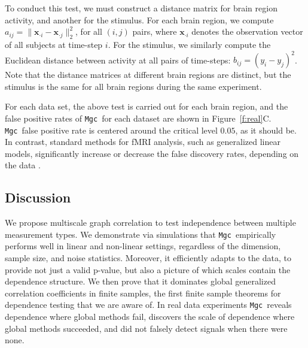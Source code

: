 \documentclass[11pt]{article}
\newcommand{\note}[2][]{\added[#1,remark={#2}]{}}
\providecommand{\sct}[1]{{\sc \texttt{#1}}}
\providecommand{\mb}[1]{\boldsymbol{#1}}
\newcommand{\Mgc}{\sct{Mgc}}
\newcommand{\cs}[1]{{\note{cs: #1}}}
\newcommand{\mbx}{\ensuremath{\mb{x}}}
\begin{document}
To conduct this test, we must construct a distance matrix for brain region activity, and another for the stimulus. For each brain region, we compute $a_{ij}=\|\mbx_{\cdot i}-\mbx_{\cdot j}\|_2^2$, for all $(i,j)$ pairs,  where $\mbx_{\cdot i}$ denotes the observation vector of all subjects at time-step $i$.
For the stimulus, we similarly compute the Euclidean distance between activity at all pairs of time-steps: $b_{ij}= (y_i - y_j)^2$.
\cs{am i right?}
Note that the distance matrices at different brain regions are distinct, but the stimulus is the same for all brain regions during the same experiment.

For each data set, the above test is carried out for each brain region, and the false positive rates of \Mgc~for each dataset are shown in Figure~\ref{f:real}C. %
\Mgc~false positive rate is centered around the critical level $0.05$, as it should be.
In contrast,  standard methods for fMRI analysis, such as generalized linear models, significantly increase  or decrease the false discovery rates, depending on the data \cite{EklundKnutsson2012,Eklund2015}.

\subsection*{Discussion}
\label{conclu}

We propose multiscale graph correlation to test independence between multiple measurement types.
We demonstrate via simulations that \Mgc~empirically performs well in linear and non-linear settings, regardless of the dimension, sample size, and noise statistics.  Moreover, it efficiently adapts to the data, to provide not just a valid p-value, but also a picture of which scales contain the dependence structure. We then prove that it dominates global generalized correlation coefficients in finite samples, the first finite sample theorems for dependence testing that we are aware of.  
In real data experiments \Mgc~reveals dependence where global methods fail, discovers the scale of dependence where global methods succeeded, and did not falsely detect signals when there were none.
\end{document}
